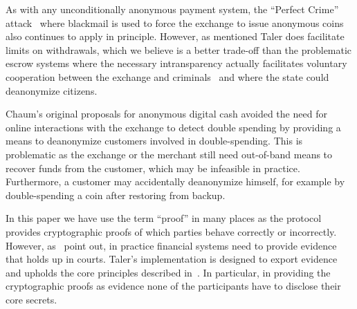 \documentclass{llncs}
\begin{document}
As with any unconditionally anonymous payment system, the ``Perfect
Crime'' attack~\cite{solms1992perfect} where blackmail is used to
force the exchange to issue anonymous coins also continues to apply in
principle.  However, as mentioned Taler does facilitate limits on
withdrawals, which we believe is a better trade-off than the
problematic escrow systems where the necessary intransparency
actually facilitates voluntary cooperation between the exchange and
criminals~\cite{sander1999escrow} and where the state could
deanonymize citizens.


Chaum's original proposals for anonymous digital cash avoided the need
for online interactions with the exchange to detect double spending by
providing a means to deanonymize customers involved in
double-spending.  This is problematic as the exchange or the merchant
still need out-of-band means to recover funds from the customer, which
may be infeasible in practice.  Furthermore, a customer may
accidentally deanonymize himself, for example by double-spending a
coin after restoring from backup.

%
%


In this paper we have use the term ``proof'' in many places as the
protocol provides cryptographic proofs of which parties behave
correctly or incorrectly. However, as~\cite{fc2014murdoch} point out,
in practice financial systems need to provide evidence that holds up
in courts.  Taler's implementation is designed to export evidence and
upholds the core principles described in~\cite{fc2014murdoch}.  In
particular, in providing the cryptographic proofs as evidence none of
the participants have to disclose their core secrets.
\end{document}
